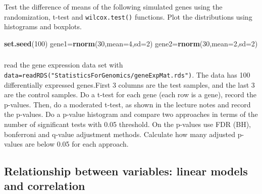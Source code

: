 \documentclass[12pt,]{krantz}
\newenvironment{Shaded}{\begin{snugshade}}{\end{snugshade}}
\newcommand{\DataTypeTok}[1]{\textcolor[rgb]{0.13,0.29,0.53}{#1}}
\newcommand{\DecValTok}[1]{\textcolor[rgb]{0.00,0.00,0.81}{#1}}
\newcommand{\KeywordTok}[1]{\textcolor[rgb]{0.13,0.29,0.53}{\textbf{#1}}}
\newcommand{\NormalTok}[1]{#1}
\begin{document}
\hypertarget{section-5}{%
\subsubsection{}\label{section-5}}

Test the difference of means of the following simulated genes
using the randomization, t-test and \texttt{wilcox.test()} functions.
Plot the distributions using histograms and boxplots.

\begin{Shaded}
\begin{Highlighting}[]
\KeywordTok{set.seed}\NormalTok{(}\DecValTok{100}\NormalTok{)}
\NormalTok{gene1=}\KeywordTok{rnorm}\NormalTok{(}\DecValTok{30}\NormalTok{,}\DataTypeTok{mean=}\DecValTok{4}\NormalTok{,}\DataTypeTok{sd=}\DecValTok{2}\NormalTok{)}
\NormalTok{gene2=}\KeywordTok{rnorm}\NormalTok{(}\DecValTok{30}\NormalTok{,}\DataTypeTok{mean=}\DecValTok{2}\NormalTok{,}\DataTypeTok{sd=}\DecValTok{2}\NormalTok{)}
\end{Highlighting}
\end{Shaded}

\hypertarget{section-6}{%
\subsubsection{}\label{section-6}}

read the gene expression data set with \texttt{data=readRDS("StatisticsForGenomics/geneExpMat.rds")}.
The data has 100 differentially expressed genes.First 3 columns
are the test samples, and the last 3 are the control samples. Do
a t-test for each gene (each row is a gene), record the p-values.
Then, do a moderated t-test, as shown in the lecture notes and record
the p-values. Do a p-value histogram and compare two approaches in terms
of the number of significant tests with 0.05 threshold.
On the p-values use FDR (BH), bonferroni and q-value adjustment methods.
Calculate how many adjusted p-values are below 0.05 for each approach.

\hypertarget{relationship-between-variables-linear-models-and-correlation-1}{%
\subsection{Relationship between variables: linear models and correlation}\label{relationship-between-variables-linear-models-and-correlation-1}}

\hypertarget{section-7}{%
\subsubsection{}\label{section-7}}
\end{document}
